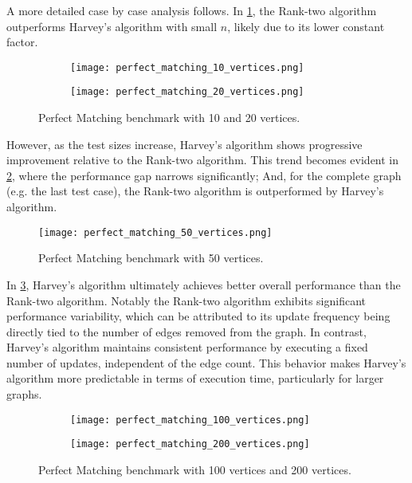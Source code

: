 A more detailed case by case analysis follows. In \cref{fig:v10-20}, the Rank-two algorithm outperforms Harvey's algorithm with small \(n\), likely due to its lower constant factor. 

\begin{figure}[h]
  \centering
  \begin{subfigure}{.5\textwidth}
    \centering
    \texttt{[image: perfect\_matching\_10\_vertices.png]}
  \end{subfigure}%
  \begin{subfigure}{.5\textwidth}
    \centering
    \texttt{[image: perfect\_matching\_20\_vertices.png]}
  \end{subfigure}
  \caption{Perfect Matching benchmark with 10 and 20 vertices.}
  \label{fig:v10-20}
\end{figure}

However, as the test sizes increase, Harvey's algorithm shows progressive improvement relative to the Rank-two algorithm. 
This trend becomes evident in \cref{fig:v50}, where the performance gap narrows significantly;
And, for the complete graph (e.g. the last test case), the Rank-two algorithm is outperformed by Harvey's algorithm.

\begin{figure}[h]
  \centering
  \texttt{[image: perfect\_matching\_50\_vertices.png]}
  \caption{Perfect Matching benchmark with 50 vertices.}
  \label{fig:v50}
\end{figure}

In \cref{fig:v100-200}, Harvey's algorithm ultimately achieves better overall performance than the Rank-two algorithm.
Notably the Rank-two algorithm exhibits significant performance variability, which can be attributed to its update frequency being directly tied to the number of edges removed from the graph. 
In contrast, Harvey's algorithm maintains consistent performance by executing a fixed number of updates, independent of the edge count. 
This behavior makes Harvey's algorithm more predictable in terms of execution time, particularly for larger graphs.

\begin{figure}[H]
  \centering
  \begin{subfigure}{.5\textwidth}
    \centering
    \texttt{[image: perfect\_matching\_100\_vertices.png]}
  \end{subfigure}%
  \begin{subfigure}{.5\textwidth}
    \centering
    \texttt{[image: perfect\_matching\_200\_vertices.png]}
  \end{subfigure}
  \caption{Perfect Matching benchmark with 100 vertices and 200 vertices.}
  \label{fig:v100-200}
\end{figure}
